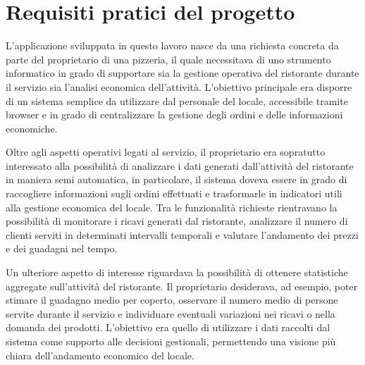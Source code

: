 \section{Requisiti pratici del progetto}

L’applicazione sviluppata in questo lavoro nasce da una richiesta concreta da parte del proprietario di una pizzeria, il quale necessitava di uno strumento informatico in grado di supportare sia la gestione operativa del ristorante durante il servizio sia l’analisi economica dell’attività. L’obiettivo principale era disporre di un sistema semplice da utilizzare dal personale del locale, accessibile tramite browser e in grado di centralizzare la gestione degli ordini e delle informazioni economiche.

Oltre agli aspetti operativi legati al servizio, il proprietario era sopratutto interessato alla possibilità di analizzare i dati generati dall’attività del ristorante in maniera semi automatica, in particolare, il sistema doveva essere in grado di raccogliere informazioni sugli ordini effettuati e trasformarle in indicatori utili alla gestione economica del locale. Tra le funzionalità richieste rientravano la possibilità di monitorare i ricavi generati dal ristorante, analizzare il numero di clienti serviti in determinati intervalli temporali e valutare l’andamento dei prezzi e dei guadagni nel tempo.

Un ulteriore aspetto di interesse riguardava la possibilità di ottenere statistiche aggregate sull’attività del ristorante. Il proprietario desiderava, ad esempio, poter stimare il guadagno medio per coperto, osservare il numero medio di persone servite durante il servizio e individuare eventuali variazioni nei ricavi o nella domanda dei prodotti. L’obiettivo era quello di utilizzare i dati raccolti dal sistema come supporto alle decisioni gestionali, permettendo una visione più chiara dell’andamento economico del locale.